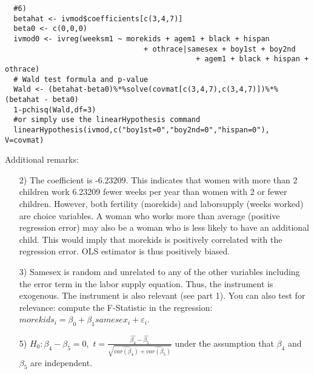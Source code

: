\begin{Solution}{13.6}
\begin{verbatim}
  #6)
  betahat <- ivmod$coefficients[c(3,4,7)]
  beta0 <- c(0,0,0)
  ivmod0 <- ivreg(weeksm1 ~ morekids + agem1 + black + hispan
                                + othrace|samesex + boy1st + boy2nd
                                            + agem1 + black + hispan + othrace)
  # Wald test formula and p-value
  Wald <- (betahat-beta0)%*%solve(covmat[c(3,4,7),c(3,4,7)])%*%(betahat - beta0)
  1-pchisq(Wald,df=3)
  #or simply use the linearHypothesis command
  linearHypothesis(ivmod,c("boy1st=0","boy2nd=0","hispan=0"), V=covmat)
\end{verbatim}
Additional remarks:
\begin{itemize}
  \item[2)] The coefficient is -6.23209. This indicates that women with
      more than 2 children work 6.23209 fewer weeks per year than women
      with 2 or fewer children. However, both fertility (morekids) and
      laborsupply (weeks worked) are choice variables. A woman who works
      more than average (positive regression error) may also be a woman
      who is less likely to have an additional child. This would imply
      that morekids is positively correlated with the regression error.
      OLS estimator is thus positively biased.
  \item[3)] Samesex is random and unrelated to any of the other variables
      including the error term in the labor supply equation. Thus, the
      instrument is exogenous. The instrument is also relevant (see part
      1). You can also test for relevance: compute the F-Statistic in the
      regression: $morekids_i = \beta_0+\beta_1 samesex_i +
      \varepsilon_i$.
  \item[5)] $H_0: \beta_4-\beta_5 = 0,$ $ t=\frac{\widehat{\beta_4} -
      \widehat{\beta_5}}{\sqrt{\widehat{var(\beta_4)}+\widehat{var(\beta_5)}}}$
      under the assumption that $\beta_4$ and $\beta_5$ are independent.
  \end{itemize}
\end{Solution}
